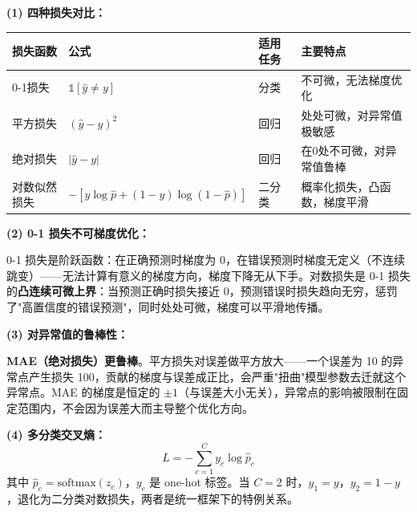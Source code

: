 \documentclass[a4paper,11pt]{ctexart}
\begin{document}
\begin{solutionbox}[参考答案与详细解析]
    \textbf{(1) 四种损失对比：}
    \begin{center}
    \begin{tabular}{p{2.8cm} p{3.5cm} p{3cm} p{3cm}}
        \toprule
        损失函数 & 公式 & 适用任务 & 主要特点 \\
        \midrule
        0-1损失 & $\mathbb{1}[\hat{y}\neq y]$ & 分类 & 不可微，无法梯度优化 \\[0.8em]
        平方损失 & $(\hat{y}-y)^2$ & 回归 & 处处可微，对异常值极敏感 \\[0.8em]
        绝对损失 & $|\hat{y}-y|$ & 回归 & 在0处不可微，对异常值鲁棒 \\[0.8em]
        对数似然损失 & $-[y\log\hat{p}+(1-y)\log(1-\hat{p})]$ & 二分类 & 概率化损失，凸函数，梯度平滑 \\
        \bottomrule
    \end{tabular}
    \end{center}

    \textbf{(2) 0-1 损失不可梯度优化：}

    0-1 损失是阶跃函数：在正确预测时梯度为 0，在错误预测时梯度无定义（不连续跳变）——无法计算有意义的梯度方向，梯度下降无从下手。对数损失是 0-1 损失的\textbf{凸连续可微上界}：当预测正确时损失接近 0，预测错误时损失趋向无穷，惩罚了"高置信度的错误预测"，同时处处可微，梯度可以平滑地传播。

    \textbf{(3) 对异常值的鲁棒性：}

    \textbf{MAE（绝对损失）更鲁棒}。平方损失对误差做平方放大——一个误差为 10 的异常点产生损失 100，贡献的梯度与误差成正比，会严重"扭曲"模型参数去迁就这个异常点。MAE 的梯度是恒定的 $\pm 1$（与误差大小无关），异常点的影响被限制在固定范围内，不会因为误差大而主导整个优化方向。

    \textbf{(4) 多分类交叉熵：}
    \[
    L = -\sum_{c=1}^C y_c \log \hat{p}_c
    \]
    其中 $\hat{p}_c = \text{softmax}(z_c)$，$y_c$ 是 one-hot 标签。当 $C=2$ 时，$y_1 = y$，$y_2 = 1-y$，退化为二分类对数损失，两者是统一框架下的特例关系。
\end{solutionbox}
\end{document}
